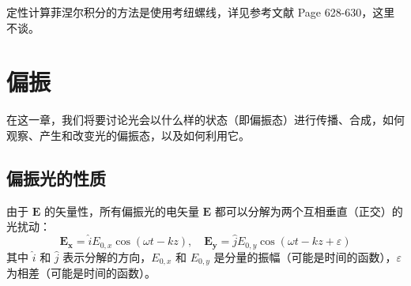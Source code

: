 \documentclass[UTF8]{report}
\theoremstyle{MyLineTheoremStyle} %
\theoremstyle{MyBlockTheoremStyle} %
\theoremstyle{MySubsubsectionStyle} %
\begin{document}
定性计算菲涅尔积分的方法是使用考纽螺线，详见参考文献 \cite{Optics} Page 628-630，这里不谈。




\chapter{偏振}\thispagestyle{fancy}
在这一章，我们将要讨论光会以什么样的状态（即偏振态）进行传播、合成，如何观察、产生和改变光的偏振态，以及如何利用它。

\section{偏振光的性质}
由于 $\boldsymbol{E}$ 的矢量性，所有偏振光的电矢量 $\boldsymbol{E}$ 都可以分解为两个互相垂直（正交）的光扰动：
\begin{equation}
\boldsymbol{E_x} = \hat{i} E_{0, x} \cos(\omega t - k z),\quad \boldsymbol{E_y} = \hat{j} E_{0, y} \cos(\omega t - k z + \varepsilon)
\end{equation}
其中 $\hat{i}$ 和 $\hat{j}$ 表示分解的方向，$E_{0, x}$ 和 $E_{0, y}$ 是分量的振幅（可能是时间的函数），$\varepsilon$ 为相差（可能是时间的函数）。
































































\nocite{*}

\thispagestyle{fancy} 
\end{document}
